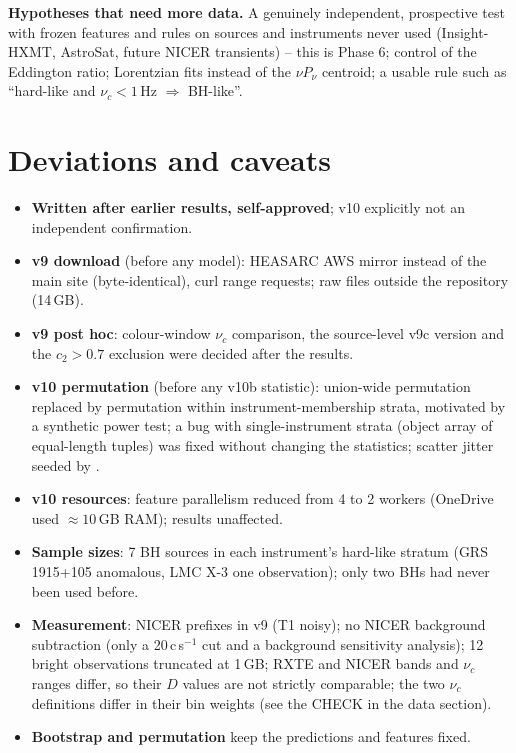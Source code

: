 \textbf{Hypotheses that need more data.} A genuinely independent, prospective test with frozen features and rules on sources and
instruments never used (Insight-HXMT, AstroSat, future NICER transients) -- this is Phase 6; control of the Eddington ratio; Lorentzian
fits instead of the $\nu P_\nu$ centroid; a usable rule such as ``hard-like and $\nu_c<1$\,Hz $\Rightarrow$ BH-like''.

\section{Deviations and caveats}\label{sec:p5caveats}
\begin{itemize}
\item \textbf{Written after earlier results, self-approved}; v10 explicitly not an independent confirmation.
\item \textbf{v9 download} (before any model): HEASARC AWS mirror instead of the main site (byte-identical), curl range requests;
raw files outside the repository (14\,GB).
\item \textbf{v9 post hoc}: colour-window $\nu_c$ comparison, the source-level v9c version and the $c_2>0.7$ exclusion were decided after the
results.
\item \textbf{v10 permutation} (before any v10b statistic): union-wide permutation replaced by permutation within instrument-membership
strata, motivated by a synthetic power test; a bug with single-instrument strata (object array of equal-length tuples) was fixed without
changing the statistics; scatter jitter seeded by .
\item \textbf{v10 resources}: feature parallelism reduced from 4 to 2 workers (OneDrive used $\approx10$\,GB RAM); results unaffected.
\item \textbf{Sample sizes}: 7 BH sources in each instrument's hard-like stratum (GRS 1915+105 anomalous, LMC X-3 one observation); only
two BHs had never been used before.
\item \textbf{Measurement}: NICER prefixes in v9 (T1 noisy); no NICER background subtraction (only a 20\,c\,s$^{-1}$ cut and a background
sensitivity analysis); 12 bright observations truncated at 1\,GB; RXTE and NICER bands and $\nu_c$ ranges differ, so their $D$ values are
not strictly comparable; the two $\nu_c$ definitions differ in their bin weights (see the CHECK in the data section).
\item \textbf{Bootstrap and permutation} keep the predictions and features fixed.
\end{itemize}

